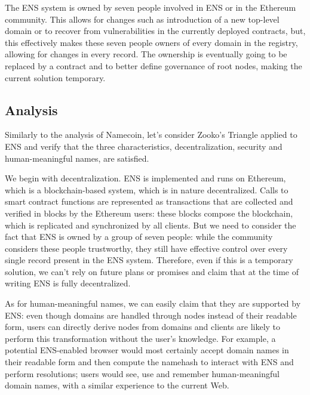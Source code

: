 \documentclass[mscthesis]{usiinfthesis}
\begin{document}
The ENS system is owned by seven people involved in ENS or in the Ethereum community. This allows for changes such as introduction of a new top-level domain or to recover from vulnerabilities in the currently deployed contracts, but, this effectively makes these seven people owners of every domain in the registry, allowing for changes in every record. The ownership is eventually going to be replaced by a contract and to better define governance of root nodes, making the current solution temporary.

\subsection{Analysis}

Similarly to the analysis of Namecoin, let's consider Zooko's Triangle applied to ENS and verify that the three characteristics, decentralization, security and human-meaningful names, are satisfied.

We begin with decentralization. ENS is implemented and runs on Ethereum, which is a blockchain-based system, which is in nature decentralized. Calls to smart contract functions are represented as transactions that are collected and verified in blocks by the Ethereum users: these blocks compose the blockchain, which is replicated and synchronized by all clients. But we need to consider the fact that ENS is owned by a group of seven people: while the community considers these people trustworthy, they still have effective control over every single record present in the ENS system. Therefore, even if this is a temporary solution, we can't rely on future plans or promises and claim that at the time of writing ENS is fully decentralized.

As for human-meaningful names, we can easily claim that they are supported by ENS: even though domains are handled through nodes instead of their readable form, users can directly derive nodes from domains and clients are likely to perform this transformation without the user's knowledge. For example, a potential ENS-enabled browser would most certainly accept domain names in their readable form and then compute the namehash to interact with ENS and perform resolutions; users would see, use and remember human-meaningful domain names, with a similar experience to the current Web.
\end{document}

